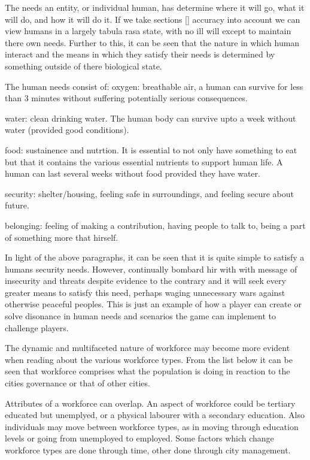 The needs an entity, or individual human, has determine where it will go, what it will do, and how it will do it. If we take sections [] accuracy into account we can view humans in a largely tabula rasa state, with no ill will except to maintain there own needs. Further to this, it can be seen that the nature in which human interact and the means in which they satisfy their needs is determined by something outside of there biological state. 

The human needs consist of:
oxygen: breathable air, a human can survive for less than 3 minutes without suffering potentially serious consequences. 

water: clean drinking water. The human body can survive upto a week without water (provided good conditions). 

food: sustainence and nutrtion. It is essential to not only have something to eat but that it contains the various essential nutrients to support human life. A human can last several weeks without food provided they have water.

security: shelter/housing, feeling safe in surroundings, and feeling secure about future.

belonging: feeling of making a contribution, having people to talk to, being a part of something more that hirself.

In light of the above paragraphs, it can be seen that it is quite simple to satisfy a humans security needs. However, continually bombard hir with with message of insecurity and threats despite evidence to the contrary and it will seek every greater means to satisfy this need, perhaps waging unnecessary wars against otherwise peaceful peoples. This is just an example of how a player can create or solve disonance in human needs and scenarios the game can implement to challenge players.



The dynamic and multifaceted nature of workforce may become more evident when reading about the various workforce types. From the list below it can be seen that workforce comprises what the population is doing in reaction to the cities governance or that of other cities.

Attributes of a workforce can overlap. An aspect of workforce could be tertiary educated but unemplyed, or a physical labourer with a secondary education. Also individuals may move between workforce types, as in moving through education levels or going from unemployed to employed. Some factors which change workforce types are done through time, other done through city management.


